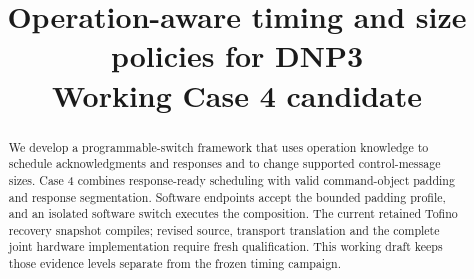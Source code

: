 \documentclass[conference]{IEEEtran}
\title{Operation-aware timing and size policies for DNP3\\Working Case 4 candidate}
\author{}
\begin{document}
\maketitle
\begin{abstract}
We develop a programmable-switch framework that uses operation knowledge to
schedule acknowledgments and responses and to change supported control-message
sizes. Case 4 combines response-ready scheduling with valid command-object
padding and response segmentation. Software endpoints accept the bounded padding
profile, and an isolated software switch executes the composition. The current
retained Tofino recovery snapshot compiles; revised source, transport translation
and the complete joint hardware implementation require fresh qualification.
This working draft
keeps those evidence levels separate from the frozen timing campaign.
\end{abstract}






\end{document}
